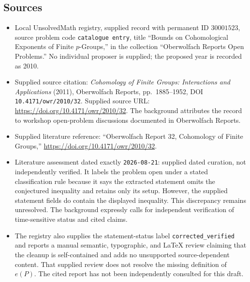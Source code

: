 \documentclass[11pt]{article}
\begin{document}
\subsection{Sources}
\begin{itemize}
\item Local UnsolvedMath registry, supplied record with permanent ID \(30001523\), source problem code \texttt{catalogue entry}, title ``Bounds on Cohomological Exponents of Finite \(p\)-Groups,'' in the collection ``Oberwolfach Reports Open Problems.'' No individual proposer is supplied; the proposed year is recorded as 2010.
\item Supplied source citation: \emph{Cohomology of Finite Groups: Interactions and Applications} (2011), Oberwolfach Reports, pp.~1885--1952, DOI \texttt{10.4171/owr/2010/32}. Supplied source URL: \url{https://doi.org/10.4171/owr/2010/32}. The background attributes the record to workshop open-problem discussions documented in Oberwolfach Reports.
\item Supplied literature reference: ``Oberwolfach Report 32, Cohomology of Finite Groups,'' \url{https://doi.org/10.4171/owr/2010/32}.
\item Literature assessment dated exactly \texttt{2026-08-21}: supplied dated curation, not independently verified. It labels the problem open under a stated classification rule because it says the extracted statement omits the conjectured inequality and retains only its setup. However, the supplied statement fields do contain the displayed inequality. This discrepancy remains unresolved. The background expressly calls for independent verification of time-sensitive status and cited claims.
\item The registry also supplies the statement-status label \texttt{corrected\_verified} and reports a manual semantic, typographic, and LaTeX review claiming that the cleanup is self-contained and adds no unsupported source-dependent content. That supplied review does not resolve the missing definition of \(e(P)\). The cited report has not been independently consulted for this draft.
\end{itemize}
\end{document}
